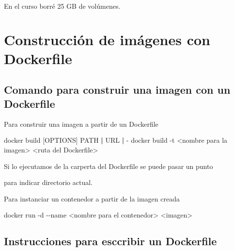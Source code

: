 \documentclass[
]{article}
\newenvironment{Shaded}{\begin{snugshade}}{\end{snugshade}}
\newcommand{\AttributeTok}[1]{\textcolor[rgb]{0.49,0.56,0.16}{#1}}
\newcommand{\ExtensionTok}[1]{#1}
\newcommand{\KeywordTok}[1]{\textcolor[rgb]{0.00,0.44,0.13}{\textbf{#1}}}
\newcommand{\NormalTok}[1]{#1}
\newcommand{\OperatorTok}[1]{\textcolor[rgb]{0.40,0.40,0.40}{#1}}
\let\oldtexttt\texttt
\renewcommand{\texttt}[1]{
    \tcbox{\oldtexttt{#1}} 
}
\begin{document}
En el curso borré 25 GB de volúmenes.

\hypertarget{construcciuxf3n-de-imuxe1genes-con-dockerfile}{%
\section{Construcción de imágenes con
Dockerfile}\label{construcciuxf3n-de-imuxe1genes-con-dockerfile}}

\hypertarget{comando-para-construir-una-imagen-con-un-dockerfile}{%
\subsection{Comando para construir una imagen con un
Dockerfile}\label{comando-para-construir-una-imagen-con-un-dockerfile}}

Para construir una imagen a partir de un Dockerfile

\begin{Shaded}
\begin{Highlighting}[]
\ExtensionTok{docker}\NormalTok{ build [OPTIONS] PATH }\KeywordTok{|} \ExtensionTok{URL} \KeywordTok{|} \ExtensionTok{{-}}
\ExtensionTok{docker}\NormalTok{ build }\AttributeTok{{-}t} \OperatorTok{\textless{}}\NormalTok{nombre para la imagen}\OperatorTok{\textgreater{}} \OperatorTok{\textless{}}\NormalTok{ruta del Dockerfile}\OperatorTok{\textgreater{}}
\end{Highlighting}
\end{Shaded}

Si lo ejecutamos de la carperta del Dockerfile se puede pasar un punto
\texttt{.} para indicar directorio actual.

Para instanciar un contenedor a partir de la imagen creada

\begin{Shaded}
\begin{Highlighting}[]
\ExtensionTok{docker}\NormalTok{ run }\AttributeTok{{-}d} \AttributeTok{{-}{-}name} \OperatorTok{\textless{}}\NormalTok{nombre para el contenedor}\OperatorTok{\textgreater{}} \OperatorTok{\textless{}}\NormalTok{imagen}\OperatorTok{\textgreater{}}
\end{Highlighting}
\end{Shaded}

\hypertarget{instrucciones-para-esccribir-un-dockerfile}{%
\subsection{Instrucciones para esccribir un
Dockerfile}\label{instrucciones-para-esccribir-un-dockerfile}}
\end{document}
